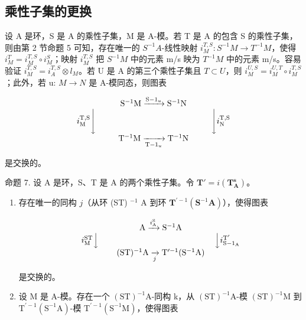 \subsection{乘性子集的更换}

设 A 是环，S 是 A 的乘性子集，M 是 A-模。若 T 是 A 的包含 S 的乘性子集，则由第 2 节命题 5 可知，存在唯一的 \(S^{-1}A\)-线性映射 \(i_{M}^{T,S}:S^{-1}M\to T^{-1}M\)，使得 \(i_{M}^{T}=i_{M}^{T,S}\circ i_{M}^{S}\)；映射 \(i_{M}^{T,S}\) 把 \(S^{-1}M\) 中的元素 m/s 映为 \(T^{-1}M\) 中的元素 m/s。容易验证 \(i_{M}^{T,S}=i_{A}^{T,S}\otimes l_{M}\)。若 U 是 A 的第三个乘性子集且 \(T\subset U\)，则 \(i_{M}^{U,S}=i_{M}^{U,T}\circ i_{M}^{T,S}\)；此外，若 u: \(M\to N\) 是 A-模同态，则图表

\[
\begin{array}{c} \mathrm{S} ^ {- 1} \mathrm{M} \xrightarrow {\mathrm{S} - 1 _ {u}} \mathrm{S} ^ {- 1} \mathrm{N} \\ i _ {\mathrm{M}} ^ {\mathrm{T}, \mathrm{S}} \Biggl \downarrow \qquad \qquad \qquad \qquad \qquad \qquad \qquad \Biggl \downarrow i _ {\mathrm{N}} ^ {\mathrm{T}, \mathrm{S}} \\ \mathrm{T} ^ {- 1} \mathrm{M} \xrightarrow [ \mathrm{T} - 1 _ {u} ]{} \mathrm{T} ^ {- 1} \mathrm{N} \end{array}
\]

是交换的。

命题 7. 设 A 是环，S、T 是 A 的两个乘性子集。令 \(\mathbf{T}' = i(\mathbf{T}_{\mathbf{A}}^{\mathbf{s}})\)。

\begin{enumerate}
\def\labelenumi{(\roman{enumi})}
\tightlist
\item
  存在唯一的同构 \(j\)（从环 (ST) \(^{-1}\) A 到环 \(\mathbf{T}^{\prime -1}(\mathbf{S}^{-1}\mathbf{A})\)），使得图表

\[
\begin{array}{c} \mathrm{A} \xrightarrow {i _ {\mathrm{A}} ^ {\mathrm{S}}} \mathrm{S} ^ {- 1} \mathrm{A} \\ i _ {\mathrm{M}} ^ {\mathrm{ST}} \Big \downarrow \qquad \qquad \qquad \qquad \qquad \qquad \qquad \Big \downarrow i _ {\mathrm{S} - 1 _ {\mathrm{A}}} ^ {\mathrm{T} ^ {\prime}} \\ (\mathrm{ST}) ^ {- 1} \mathrm{A} \xrightarrow [ j ]{} \mathrm{T} ^ {\prime - 1} (\mathrm{S} ^ {- 1} \mathrm{A}) \end{array}
\]

是交换的。

\item
  设 M 是 A-模。存在一个 \((\mathrm{ST})^{-1}\mathrm{A}\)-同构 k，从 \((\mathrm{ST})^{-1}\mathrm{A}\)-模 \((\mathrm{ST})^{-1}\mathrm{M}\) 到 \(\mathrm{T}^{\prime-1}(\mathrm{S}^{-1}\mathrm{A})\)-模 \(\mathrm{T}^{\prime-1}(\mathrm{S}^{-1}\mathrm{M})\)，使得图表
\end{enumerate}


